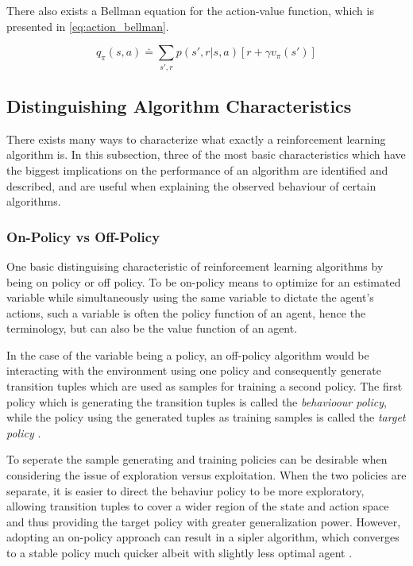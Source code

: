 \documentclass[../report.tex]{subfiles}
\begin{document}
There also exists a Bellman equation for the action-value function, which is presented in \autoref{eq:action_bellman}.

\begin{equation}\label{eq:action_bellman}
    q_{\pi}(s,a) \doteq \sum\limits_{s', r} p(s', r|s, a)[r + \gamma v_{\pi}(s')] 
\end{equation}


\subsection{Distinguishing Algorithm Characteristics}

There exists many ways to characterize what exactly a reinforcement learning algorithm is. In this subsection, three of the most basic characteristics which have the biggest implications on the performance of an algorithm are identified and described, and are useful when explaining the observed behaviour of certain algorithms.

\subsubsection{On-Policy vs Off-Policy}

One basic distinguising characteristic of reinforcement learning algorithms by being on policy or off policy. To be on-policy means to optimize for an estimated variable while simultaneously using the same variable to dictate the agent's actions, such a variable is often the policy function of an agent, hence the terminology, but can also be the value function of an agent.  

In the case of the variable being a policy, an off-policy algorithm would be interacting with the environment using one policy and consequently generate transition tuples which are used as samples for training a second policy. The first policy which is generating the transition tuples is called the \textit{behavioour policy}, while the policy using the generated tuples as training samples is called the \textit{target policy} \cite{intro_rl}.

To seperate the sample generating and training policies can be desirable when considering the issue of exploration versus exploitation. When the two policies are separate, it is easier to direct the behaviur policy to be more exploratory, allowing transition tuples to cover a wider region of the state and action space and thus providing the target policy with greater generalization power. However, adopting an on-policy approach can result in a sipler algorithm, which converges to a stable policy much quicker albeit with slightly less optimal agent \cite{drl_a_textbook}.
\end{document}

